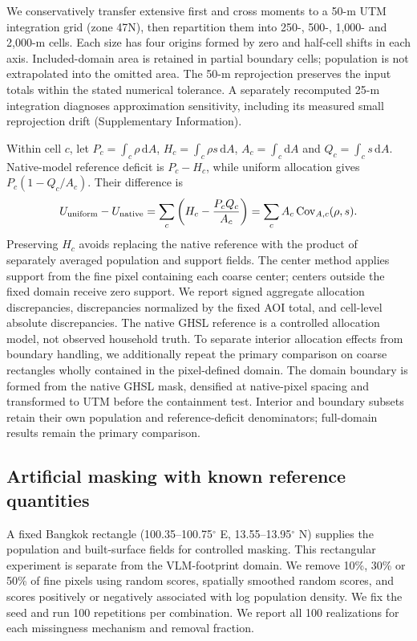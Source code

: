 \documentclass[pdflatex,lineno,sn-nature]{sn-jnl}
\begin{document}
We conservatively transfer extensive first and cross moments to a 50-m UTM integration grid (zone 47N), then repartition them into 250-, 500-, 1,000- and 2,000-m cells. Each size has four origins formed by zero and half-cell shifts in each axis. Included-domain area is retained in partial boundary cells; population is not extrapolated into the omitted area. The 50-m reprojection preserves the input totals within the stated numerical tolerance. A separately recomputed 25-m integration diagnoses approximation sensitivity, including its measured small reprojection drift (Supplementary Information).

Within cell $c$, let $P_c=\int_c\rho\,\mathrm{d}A$, $H_c=\int_c\rho s\,\mathrm{d}A$, $A_c=\int_c\mathrm{d}A$ and $Q_c=\int_c s\,\mathrm{d}A$. Native-model reference deficit is $P_c-H_c$, while uniform allocation gives $P_c(1-Q_c/A_c)$. Their difference is
\begin{equation}
U_{\rm uniform}-U_{\rm native}
=\sum_c\left(H_c-\frac{P_c Q_c}{A_c}\right)
=\sum_c A_c\operatorname{Cov}_{A,c}(\rho,s).
\label{eq:covariance}
\end{equation}
Preserving $H_c$ avoids replacing the native reference with the product of separately averaged population and support fields. The center method applies support from the fine pixel containing each coarse center; centers outside the fixed domain receive zero support. We report signed aggregate allocation discrepancies, discrepancies normalized by the fixed AOI total, and cell-level absolute discrepancies. The native GHSL reference is a controlled allocation model, not observed household truth. To separate interior allocation effects from boundary handling, we additionally repeat the primary comparison on coarse rectangles wholly contained in the pixel-defined domain. The domain boundary is formed from the native GHSL mask, densified at native-pixel spacing and transformed to UTM before the containment test. Interior and boundary subsets retain their own population and reference-deficit denominators; full-domain results remain the primary comparison.

\subsection{Artificial masking with known reference quantities}
A fixed Bangkok rectangle (100.35--100.75$^\circ$ E, 13.55--13.95$^\circ$ N) supplies the population and built-surface fields for controlled masking. This rectangular experiment is separate from the VLM-footprint domain. We remove 10\%, 30\% or 50\% of fine pixels using random scores, spatially smoothed random scores, and scores positively or negatively associated with log population density. We fix the seed and run 100 repetitions per combination. We report all 100 realizations for each missingness mechanism and removal fraction.
\end{document}
